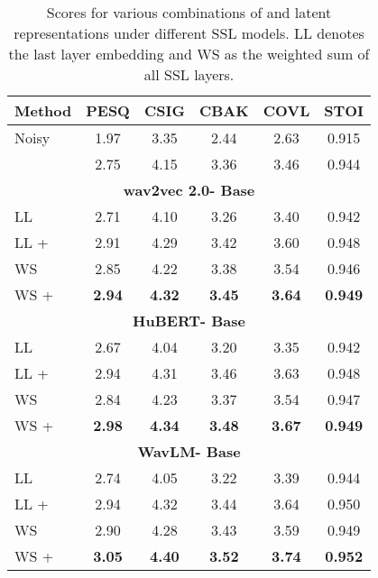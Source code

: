 \documentclass[a4paper]{article}
\begin{document}
\begin{table}[th]
  \caption{Scores for various combinations of  and latent representations under different SSL models. LL denotes the last layer embedding and WS as the weighted sum of all SSL layers.}
  \label{table: SSL_models}
  \centering
  \begin{tabular}{l@{}ccccc}
    \toprule
    \multicolumn{1}{c}{\textbf{Method}} & \multicolumn{1}{c}{\textbf{PESQ}} & \multicolumn{1}{c}{\textbf{CSIG}} & \multicolumn{1}{c}{\textbf{CBAK}} & \multicolumn{1}{c}{\textbf{COVL}} & \multicolumn{1}{c}{\textbf{STOI}} \\
    \midrule
    Noisy       &1.97   &3.35  & 2.44  &2.63  &0.915 \\
       &2.75   &4.15  & 3.36  &3.46  &0.944 \\


    \cmidrule(r){1-6}
    \multicolumn{6}{c}{\textbf{wav2vec 2.0- Base}}\\
    \cmidrule(r){1-6}
    LL  & 2.71   & 4.10  & 3.26  & 3.40  & 0.942 \\
    LL +          & 2.91   & 4.29  & 3.42  & 3.60  & 0.948 \\
    WS    & 2.85   & 4.22  & 3.38  & 3.54  & 0.946 \\
    WS +             & \textbf{2.94}   & \textbf{4.32}  & \textbf{3.45}  & \textbf{3.64}  & \textbf{0.949} \\
                        
                        
        \cmidrule(r){1-6}
    \multicolumn{6}{c}{\textbf{HuBERT- Base}}\\
    \cmidrule(r){1-6}
    LL   & 2.67   & 4.04  & 3.20  & 3.35  & 0.942 \\
    LL +          & 2.94   & 4.31  & 3.46  & 3.63  & 0.948 \\
    WS   & 2.84   & 4.23  & 3.37  & 3.54  & 0.947 \\
    WS +              & \textbf{2.98}   & \textbf{4.34}  & \textbf{3.48}  & \textbf{3.67}  & \textbf{0.949} \\
                  
          
    \cmidrule(r){1-6}
    \multicolumn{6}{c}{\textbf{WavLM- Base}}\\
    \cmidrule(r){1-6}
    LL   & 2.74   & 4.05  & 3.22  & 3.39  & 0.944 \\
    LL +          & 2.94   & 4.32  & 3.44  & 3.64  & 0.950 \\
    WS   & 2.90   & 4.28  & 3.43  & 3.59  & 0.949 \\
    WS +           & \textbf{3.05}   & \textbf{4.40}  & \textbf{3.52}  & \textbf{3.74}  & \textbf{0.952} \\
    



    \bottomrule
  \end{tabular}
\end{table}
\end{document}
